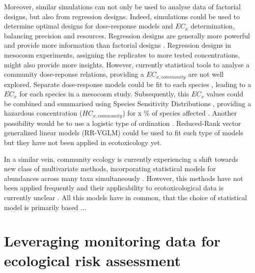 Moreover, similar simulations can not only be used to analyse data of factorial designs, but also from regression designs.
Indeed, simulations could be used to determine optimal designs for dose-response models and $EC_x$ determination, balancing precision and resources. 
Regression designs are generally more powerful and provide more information than factorial designs  \citep{cottingham_knowing_2005}. 
Regression designs in mesocosm experiments, assigning the replicates to more tested concentrations, might also provide more insights.
However, currently statistical tools to analyse a community dose-reponse relations, providing a $EC_{x, community}$ are not well explored.
Separate dose-response models could be fit to each species \citep{ritz_toward_2010}, leading to a $EC_x$ for each species in a mesocosm study.
Subsequently, this $EC_x$ values could be combined and summarised using Species Sensitivity Distributions \citep{posthuma_species_2002}, providing a 
hazardous concentration ($HC_{x, community}$) for x \% of species affected \citep{maltby_insecticide_2005}. 
Another possibility would be to use a logistic type of ordination \citep{van_den_brink_multivariate_2003}. 
Reduced-Rank vector generalized linear models (RR-VGLM) could be used to fit such type of models \citep{yee_reduced-rank_2003, yee_vector_2015} but they have not been applied in ecotoxicology yet.

In a similar vein, community ecology is currently experiencing a shift towards new class of multivariate methods, incorporating statistical models for abundances across many taxa simultaneously \citep{warton_model-based_2015, warton_distance-based_2012, warton_so_2015, ter_braak_topics_2014}.
However, this methods have not been applied frequently and their applicability to ecotoxicological data is currently unclear \citep{szocs_analysing_2015}. 
All this models have in common, that the choice of statistical model is primarily based ...




\section{Leveraging monitoring data for ecological risk assessment}



